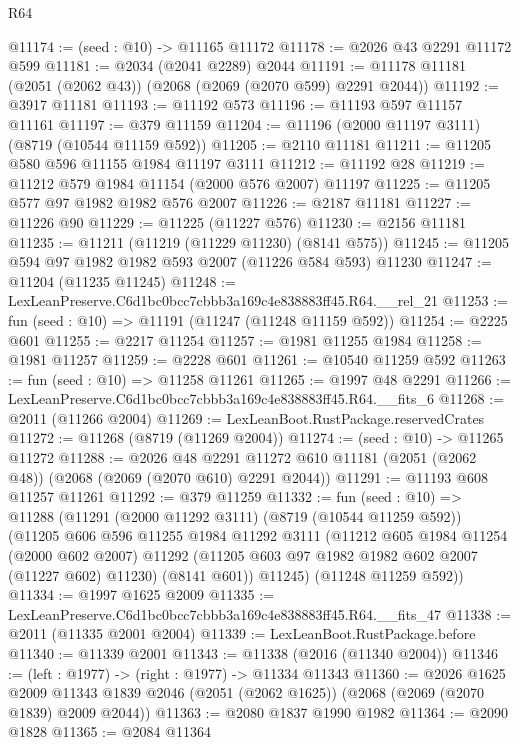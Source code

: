 \begin{lexlean}{R64}
\begin{coremodule}
@11174 := (seed : @10) -> @11165 @11172
@11178 := @2026 @43 @2291 @11172 @599
@11181 := @2034 (@2041 @2289) @2044
@11191 := @11178 @11181 (@2051 (@2062 @43)) (@2068 (@2069 (@2070 @599) @2291 @2044))
@11192 := @3917 @11181
@11193 := @11192 @573
@11196 := @11193 @597 @11157 @11161
@11197 := @379 @11159
@11204 := @11196 (@2000 @11197 @3111) (@8719 (@10544 @11159 @592))
@11205 := @2110 @11181
@11211 := @11205 @580 @596 @11155 @1984 @11197 @3111
@11212 := @11192 @28
@11219 := @11212 @579 @1984 @11154 (@2000 @576 @2007) @11197
@11225 := @11205 @577 @97 @1982 @1982 @576 @2007
@11226 := @2187 @11181
@11227 := @11226 @90
@11229 := @11225 (@11227 @576)
@11230 := @2156 @11181
@11235 := @11211 (@11219 (@11229 @11230) (@8141 @575))
@11245 := @11205 @594 @97 @1982 @1982 @593 @2007 (@11226 @584 @593) @11230
@11247 := @11204 (@11235 @11245)
@11248 := LexLeanPreserve.C6d1bc0bcc7cbbb3a169c4e838883ff45.R64.__rel_21
@11253 := fun (seed : @10) => @11191 (@11247 (@11248 @11159 @592))
@11254 := @2225 @601
@11255 := @2217 @11254
@11257 := @1981 @11255 @1984
@11258 := @1981 @11257
@11259 := @2228 @601
@11261 := @10540 @11259 @592
@11263 := fun (seed : @10) => @11258 @11261
@11265 := @1997 @48 @2291
@11266 := LexLeanPreserve.C6d1bc0bcc7cbbb3a169c4e838883ff45.R64.__fits_6
@11268 := @2011 (@11266 @2004)
@11269 := LexLeanBoot.RustPackage.reservedCrates
@11272 := @11268 (@8719 (@11269 @2004))
@11274 := (seed : @10) -> @11265 @11272
@11288 := @2026
    @48
    @2291
    @11272
    @610
    @11181
    (@2051 (@2062 @48))
    (@2068 (@2069 (@2070 @610) @2291 @2044))
@11291 := @11193 @608 @11257 @11261
@11292 := @379 @11259
@11332 := fun (seed : @10) =>
  @11288
    (@11291
      (@2000 @11292 @3111)
      (@8719 (@10544 @11259 @592))
      (@11205
        @606
        @596
        @11255
        @1984
        @11292
        @3111
        (@11212
          @605
          @1984
          @11254
          (@2000 @602 @2007)
          @11292
          (@11205 @603 @97 @1982 @1982 @602 @2007 (@11227 @602) @11230)
          (@8141 @601))
        @11245)
      (@11248 @11259 @592))
@11334 := @1997 @1625 @2009
@11335 := LexLeanPreserve.C6d1bc0bcc7cbbb3a169c4e838883ff45.R64.__fits_47
@11338 := @2011 (@11335 @2001 @2004)
@11339 := LexLeanBoot.RustPackage.before
@11340 := @11339 @2001
@11343 := @11338 (@2016 (@11340 @2004))
@11346 := (left : @1977) -> (right : @1977) -> @11334 @11343
@11360 := @2026
    @1625
    @2009
    @11343
    @1839
    @2046
    (@2051 (@2062 @1625))
    (@2068 (@2069 (@2070 @1839) @2009 @2044))
@11363 := @2080 @1837 @1990 @1982
@11364 := @2090 @1828
@11365 := @2084 @11364

\end{coremodule}
\end{lexlean}
